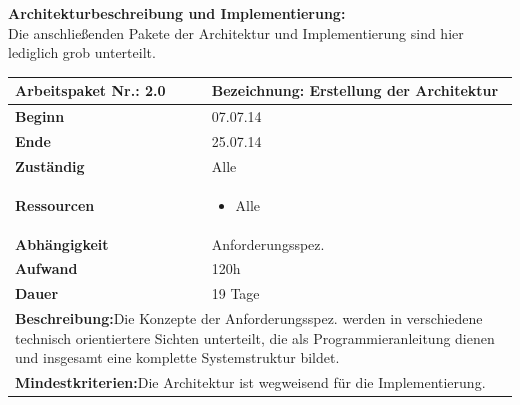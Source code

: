 \documentclass[fontsize=12pt,paper=a4,twoside]{scrartcl}
\begin{document}
\begin{verbatim} 
\end{verbatim}

\textbf{Architekturbeschreibung und Implementierung:}\\
Die anschließenden Pakete der Architektur und Implementierung sind hier lediglich grob unterteilt.

\begin{tabular}{|p{5.3cm}|p{9.7cm}|}\hline
	\textbf{Arbeitspaket Nr.:} 2.0 & \textbf{Bezeichnung:} Erstellung der Architektur\\ \hline \hline
	\textbf{Beginn} & 07.07.14\\ \hline
	\textbf{Ende} & 25.07.14\\ \hline
	\textbf{Zuständig} & Alle\\ \hline
	\textbf{Ressourcen} & \begin{itemize}
		\item Alle
	\end{itemize}    \\ \hline
	\textbf{Abhängigkeit} & Anforderungsspez.\\ \hline
	\textbf{Aufwand} & 120h\\ \hline
	\textbf{Dauer} & 19 Tage\\ \hline
	\multicolumn{2}{|p{15cm}|}{\textbf{Beschreibung:}\newline Die Konzepte der Anforderungsspez. werden in verschiedene technisch orientiertere Sichten unterteilt, die als Programmieranleitung dienen und insgesamt eine komplette Systemstruktur bildet.}\\ \hline
	\multicolumn{2}{|p{15cm}|}{\textbf{Mindestkriterien:}\newline Die Architektur ist wegweisend für die Implementierung. }\\ \hline
\end{tabular}

\begin{verbatim} 
\end{verbatim}
\end{document}
